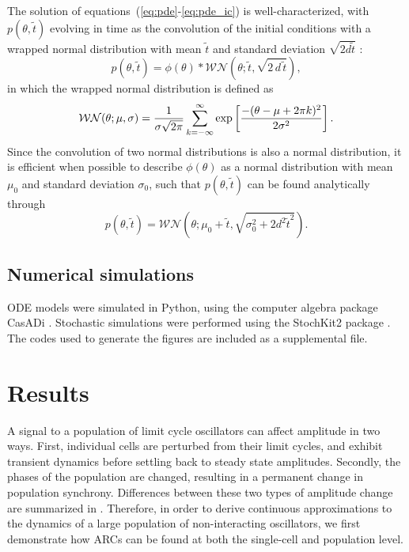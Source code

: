 The solution of equations~(\ref{eq:pde}-\ref{eq:pde_ic}) is well-characterized, with $p(\theta, \tilde{t})$ evolving in time as the convolution of the initial conditions with a wrapped normal distribution with mean $\tilde{t}$ and standard deviation $\sqrt{2d\tilde{t}}$ \cite{Chirikjian2009}:
\begin{equation}
  p(\theta, \tilde{t}) = \phi(\theta) * \mathcal{WN}(\theta; \tilde{t},
  \sqrt{2\, d\, \tilde{t}}),
\end{equation}
in which the wrapped normal distribution \cite{Mardia2009} is defined as
\begin{equation}
  {\cal WN}(\theta; \mu, \sigma) =
  \frac{1}{\sigma\sqrt{2\pi}}\sum_{k=-\infty}^\infty \exp\left[\frac{-(\theta
  - \mu + 2\pi k)^2}{2\sigma^2}\right].
  \label{eq:wrapped_normal}
\end{equation}
Since the convolution of two normal distributions is also a normal distribution, it is efficient when possible to describe $\phi(\theta)$ as a normal distribution with mean $\mu_0$ and standard deviation $\sigma_0$, such that $p(\theta, \tilde{t})$ can be found analytically through
\begin{equation}
  p(\theta, \tilde{t}) = \mathcal{WN}(\theta; \mu_0 + \tilde{t},
  \sqrt{\sigma_0^2 + 2d^2\tilde{t}^2}).
\end{equation}

\subsection{Numerical simulations}

ODE models were simulated in Python, using the computer algebra package CasADi \cite{Andersson2013b}.
Stochastic simulations were performed using the StochKit2 package \cite{Sanft2011a}.
The codes used to generate the figures are included as a supplemental file.

\section{Results}

A signal to a population of limit cycle oscillators can affect amplitude in two ways.
First, individual cells are perturbed from their limit cycles, and exhibit transient dynamics before settling back to steady state amplitudes.
Secondly, the phases of the population are changed, resulting in a permanent change in population synchrony.
Differences between these two types of amplitude change are summarized in .
Therefore, in order to derive continuous approximations to the dynamics of a large population of non-interacting oscillators, we first demonstrate how ARCs can be found at both the single-cell and population level.

